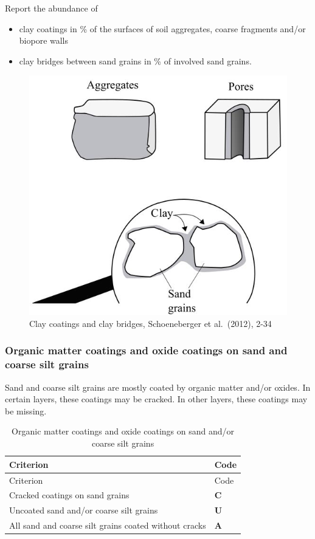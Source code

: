 \documentclass[
  letterpaper,
  DIV=11,
  numbers=noendperiod]{scrreprt}
\providecommand{\tightlist}{%
  \setlength{\itemsep}{0pt}\setlength{\parskip}{0pt}}\usepackage{longtable,booktabs,array}
\begin{document}
Report the abundance of

\begin{itemize}
\tightlist
\item
  clay coatings in \% of the surfaces of soil aggregates, coarse
  fragments and/or biopore walls
\item
  clay bridges between sand grains in \% of involved sand grains.
\end{itemize}

\begin{figure}

{\centering \includegraphics{./figure_8-20.png}

}

\caption{Clay coatings and clay bridges, Schoeneberger et al.~(2012),
2-34}

\end{figure}

\hypertarget{organic-matter-coatings-and-oxide-coatings-on-sand-and-coarse-silt-grains}{%
\subsubsection{Organic matter coatings and oxide coatings on sand and
coarse silt
grains}\label{organic-matter-coatings-and-oxide-coatings-on-sand-and-coarse-silt-grains}}

Sand and coarse silt grains are mostly coated by organic matter and/or
oxides. In certain layers, these coatings may be cracked. In other
layers, these coatings may be missing.

\begin{longtable}[]{@{}ll@{}}
\caption{Organic matter coatings and oxide coatings on sand and/or
coarse silt grains}\tabularnewline
\toprule()
Criterion & Code \\
\midrule()
\endfirsthead
\toprule()
Criterion & Code \\
\midrule()
\endhead
Cracked coatings on sand grains & \textbf{C} \\
Uncoated sand and/or coarse silt grains & \textbf{U} \\
All sand and coarse silt grains coated without cracks & \textbf{A} \\
\bottomrule()
\end{longtable}
\end{document}
